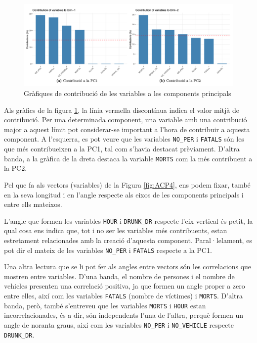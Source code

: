 \documentclass[12pt,longbibliography]{article}
\theoremstyle{definition}
\theoremstyle{remark}
\begin{document}
\begin{figure}[H]
\begin{center}
\includegraphics[width=15cm]{acp5}
\end{center}
\caption{Gràfiques de contribució de les variables a les components principals}
\label{fig:ACP5}
\end{figure}


Als gràfics de la figura \ref{fig:ACP5}, la línia vermella discontínua indica el valor mitjà de contribució. Per una determinada component, una variable amb una contribució major a aquest límit pot considerar-se important a l'hora de contribuir a aquesta component. A l'esquerra, es pot veure que les variables \texttt{NO\_PER} i \texttt{FATALS} són les que més contribueixen a la PC1, tal com s'havia destacat prèviament. D'altra banda, a la gràfica de la dreta destaca la variable \texttt{MORTS} com la més contribuent a la PC2.


Pel que fa als vectors (variables) de la Figura \ref{fig:ACP4}, ens podem fixar, també en la seva longitud i en l'angle respecte als eixos de les components principals i entre ells mateixos. 


L'angle que formen les variables \texttt{HOUR} i \texttt{DRUNK\_DR} respecte l'eix vertical és petit, la qual cosa ens indica que, tot i no ser les variables més contribuents, estan estretament relacionades amb la creació d'aquesta component. Paral·lelament, es pot dir el mateix de les variables \texttt{NO\_PER} i \texttt{FATALS} respecte a la PC1.


Una altra lectura que se li pot fer als angles entre vectors són les correlacions que mostren entre variables. D'una banda, el nombre de persones i el nombre de vehicles presenten una correlació positiva, ja que formen un angle proper a zero entre elles, així com les variables \texttt{FATALS} (nombre de víctimes) i \texttt{MORTS}. D'altra banda, però, també s'entreveu que les variables \texttt{MORTS} i \texttt{HOUR} estan incorrelacionades, és a dir, són independents l'una de l'altra, perquè formen un angle de noranta graus, així com les variables \texttt{NO\_PER} i \texttt{NO\_VEHICLE} respecte \texttt{DRUNK\_DR}.
\end{document}
